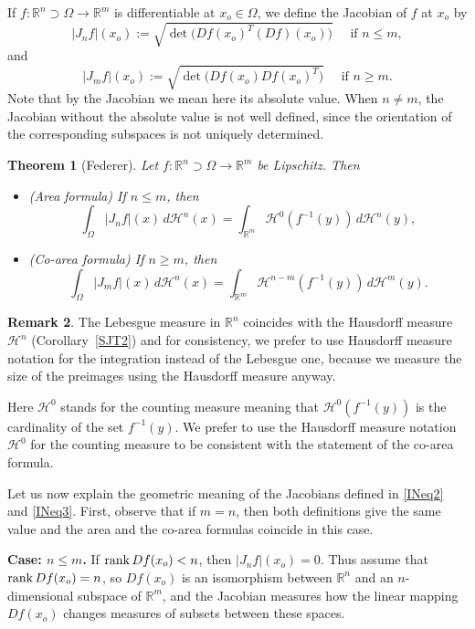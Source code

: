 \documentclass[12pt,leqno]{amsart}
\newtheorem{theorem}{Theorem}
\theoremstyle{definition}
\newtheorem{remark}[theorem]{Remark}
\newcommand{\bbbr}{\mathbb R}
\def\H{{\mathcal H}}
\def\rank{{\rm rank\,}}
\numberwithin{theorem}{section} \numberwithin{equation}{section}
\begin{document}
If $f:\bbbr^n\supset\Omega\to\bbbr^m$ is differentiable at $x_o\in\Omega$, we define the Jacobian of $f$ at $x_o$ by
\begin{equation}
\label{INeq2}
|J_n f|(x_o):=\sqrt{\det\big(Df(x_o)^T(Df)(x_o)\big)}
\quad
\text{ if } n\leq m,
\end{equation}
and
\begin{equation}
\label{INeq3}
|J_m f|(x_o):=\sqrt{\det\big(Df(x_o)Df(x_o)^T\big)}
\quad
\text{ if } n\geq m.
\end{equation}
Note that by the Jacobian we mean here its absolute value. When $n\neq m$, the Jacobian without the absolute value is not well defined, since the orientation of the corresponding
subspaces is not uniquely determined.
\begin{theorem}[Federer]
\label{INT3}
Let $f:\bbbr^n\supset\Omega\to\bbbr^m$ be Lipschitz. Then
\begin{itemize}
\item(Area formula) If $n\leq m$, then
$$
\int_\Omega |J_n f|(x)\, d\H^n(x)=\int_{\bbbr^m}\H^0(f^{-1}(y))\, d\H^n(y),
$$
\item (Co-area formula) If $n\geq m$, then
$$
\int_\Omega |J_m f|(x)\, d\H^n(x)=\int_{\bbbr^m}\H^{n-m}(f^{-1}(y))\, d\H^m(y).
$$
\end{itemize}
\end{theorem}
\begin{remark}
The Lebesgue measure in $\bbbr^n$ coincides with the Hausdorff measure $\H^n$ (Corollary~\ref{SJT2}) and for consistency, we prefer to use Hausdorff measure notation for the integration instead of the Lebesgue one, because we measure the size of the preimages using the Hausdorff measure anyway.

Here $\H^0$ stands for the counting measure  meaning that $\H^0(f^{-1}(y))$ is the cardinality of the set $f^{-1}(y)$. We prefer to use the Hausdorff measure notation $\H^0$ for the counting measure to be consistent with the statement of the co-area formula.
\end{remark}


Let us now explain the geometric meaning of the Jacobians defined in \eqref{INeq2} and \eqref{INeq3}. First, observe that if $m=n$, then both definitions give the same value and the area and the co-area formulas coincide in this case.

{\bf Case: $n\leq m$.} If $\rank Df(x_o)<n$, then $|J_n f|(x_o)=0$. Thus assume that $\rank Df(x_o)=n$, so $Df(x_o)$ is an isomorphism between $\bbbr^n$ and an $n$-dimensional subspace of $\bbbr^m$, and the Jacobian measures how the linear mapping $Df(x_o)$ changes measures of subsets between these spaces.
\end{document}
